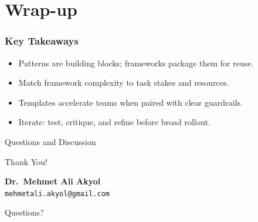 \documentclass{beamer}
\begin{document}

\section{Wrap-up}

\begin{frame}
    \frametitle{Key Takeaways}
    \begin{itemize}
        \item Patterns are building blocks; frameworks package them for reuse.
        \item Match framework complexity to task stakes and resources.
        \item Templates accelerate teams when paired with clear guardrails.
        \item Iterate: test, critique, and refine before broad rollout.
    \end{itemize}
\end{frame}

\begin{frame}{Questions and Discussion}
    \begin{center}
    {\Huge Thank You!}
    \vspace{1cm}

        \textbf{Dr.\ Mehmet Ali Akyol}\\
        \texttt{mehmetali.akyol@gmail.com}
    \vspace{1cm}

    {\large Questions?}
    \end{center}
\end{frame}
\end{document}
